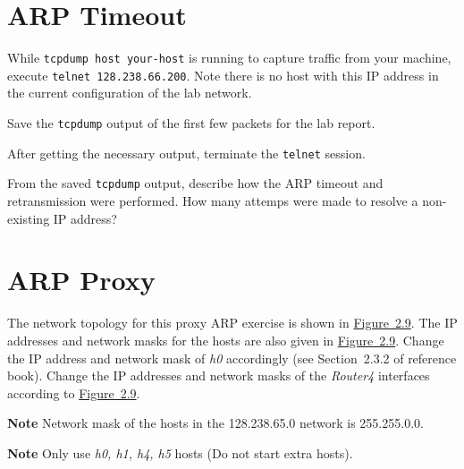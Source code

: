\documentclass{../UTNetLab}
\begin{document}
\section{ARP Timeout}
    While \lstinline[emph={your-host}]{tcpdump host your-host} is running to capture traffic from your machine, execute \lstinline{telnet 128.238.66.200}.
    Note there is no host with this IP address in the current configuration of the lab network.

    Save the \lstinline{tcpdump} output of the first few packets for the lab report.

    After getting the necessary output, terminate the \lstinline{telnet} session.

    \begin{report}
        \item From the saved \lstinline{tcpdump} output, describe how the ARP timeout and retransmission were performed.
            How many attemps were made to resolve a non-existing IP address?
    \end{report}

\section{ARP Proxy}
    The network topology for this proxy ARP exercise is shown in \hyperref[fig:2.9]{Figure~2.9}.
    The IP addresses and network masks for the hosts are also given in \hyperref[fig:2.9]{Figure~2.9}.
    Change the IP address and network mask of \textit{h0} accordingly (see Section~2.3.2 of reference book).
    Change the IP addresses and network masks of the \textit{Router4} interfaces according to \hyperref[fig:2.9]{Figure~2.9}.

    \textbf{Note}\quad
    Network mask of the hosts in the 128.238.65.0 network is 255.255.0.0.
    
    \textbf{Note}\quad
    Only use \textit{h0, h1, h4, h5} hosts (Do not start extra hosts).
\end{document}
